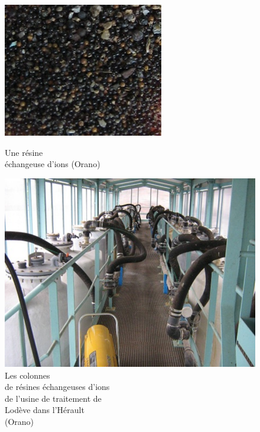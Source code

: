 \documentclass{article}
\begin{document}
\begin{figure}[H]
    \centering
    \begin{minipage}{0.33\textwidth}
        \centering
        \includegraphics[width=0.8\linewidth]{III_A_2.png}
        \caption{Une résine \\échangeuse d’ions (Orano)}
        \label{fig:resine_echangeuse_ions}
    \end{minipage}\hfill
    \begin{minipage}{0.33\textwidth}
        \centering
        \vspace{4mm} \includegraphics[width=0.8\linewidth]{III_A_3.png}
        \caption{Les colonnes \\de résines échangeuses d'ions \\de l'usine de traitement de \\Lodève dans l'Hérault \\(Orano)}
        \label{fig:usine_traitement_resines}
    \end{minipage}

\end{figure}
\end{document}
